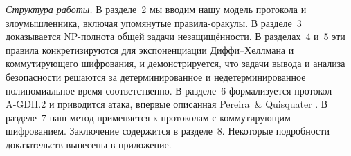 \medskip
\textit{Структура работы.} В разделе 2 мы вводим нашу модель протокола и злоумышленника, включая упомянутые правила-оракулы. В
разделе 3 доказывается NP-полнота общей задачи незащищённости. В разделах 4 и 5 эти правила конкретизируются для экспоненциации
Диффи–Хеллмана и коммутирующего шифрования, и демонстрируется, что задачи вывода и анализа безопасности решаются за детерминированное
и недетерминированное полиномиальное время соответственно. В разделе 6 формализуется протокол A‑GDH.2 и приводится атака, впервые
описанная Pereira \& Quisquater \cite{PereiraQuisquater2001}. В разделе 7 наш метод применяется к протоколам с коммутирующим
шифрованием. Заключение содержится в разделе 8. Некоторые подробности доказательств вынесены в приложение.
